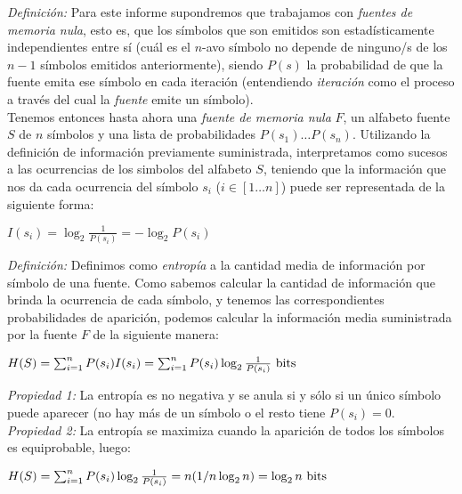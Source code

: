 \emph{Definición:} Para este informe supondremos que trabajamos con \emph{fuentes de memoria nula}, esto es, que los símbolos
que son emitidos son estadísticamente independientes entre sí (cuál es el $n$-avo símbolo no depende de ninguno/s de los $n-1$ símbolos emitidos anteriormente), siendo $P(s)$ la probabilidad de que la fuente emita ese símbolo en cada iteración (entendiendo
\emph{iteración} como el proceso a través del cual la \emph{fuente} emite un símbolo).\\

Tenemos entonces hasta ahora una \emph{fuente de memoria nula} $F$, un alfabeto fuente $S$ de $n$ símbolos y una lista
de probabilidades $P(s_1) \ldots P(s_n)$. Utilizando la definición de información previamente suministrada, interpretamos como 
sucesos a las ocurrencias de los simbolos del alfabeto $S$, teniendo que la información que nos da cada ocurrencia del símbolo
$s_i$ ($i\in[1\ldots n]$) puede ser representada de la siguiente forma:

\begin{center}
\begin{math}
I(s_i) = \log_2{\frac{1}{P(s_i)}} = -\log_2{P(s_i)}
\end{math}
\end{center}

\emph{Definición:} Definimos como \emph{entropía} a la cantidad media de información por símbolo de una fuente.
Como sabemos calcular la cantidad de información que brinda la ocurrencia de cada símbolo, y tenemos las correspondientes
probabilidades de aparición, podemos calcular la información media suministrada por la fuente $F$ de la siguiente manera:

\begin{center}
\begin{math}
H(S)= \sum_{i=1}^{n} P(s_i) I(s_i) = \sum_{i=1}^{n} P(s_i) \log_2{\frac{1}{P(s_i)}}$ bits$ 
\end{math}
\end{center}

\emph{Propiedad 1:} La entropía es no negativa y se anula si y sólo si un único símbolo puede aparecer (no hay más de un símbolo
o el resto tiene $P(s_i)=0$.\\

\emph{Propiedad 2:} La entropía se maximiza cuando la aparición de todos los símbolos es equiprobable, luego:

\begin{center}
\begin{math}
H(S)= \sum_{i=1}^{n} P(s_i) \log_2{\frac{1}{P(s_i)}} =  n (1/n \log_2{n}) = \log_2{n}$ bits$ 
\end{math}
\end{center}

